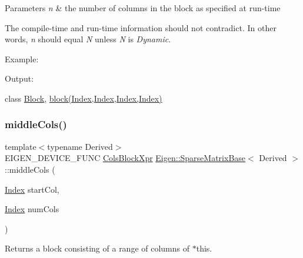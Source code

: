 \begin{DoxyParams}{Parameters}
{\em n} & the number of columns in the block as specified at run-\/time\\
\hline
\end{DoxyParams}
The compile-\/time and run-\/time information should not contradict. In other words, {\itshape n} should equal {\itshape N} unless {\itshape N} is {\itshape Dynamic}.

Example\+: 
\begin{DoxyCodeInclude}{0}
\end{DoxyCodeInclude}
 Output\+: 
\begin{DoxyVerbInclude}
\end{DoxyVerbInclude}
 class \mbox{\hyperlink{class_eigen_1_1_block}{Block}}, \mbox{\hyperlink{class_eigen_1_1_sparse_matrix_base_a7c28a2f511181c727396d5e813519d38}{block(\+Index,\+Index,\+Index,\+Index)}} \mbox{\label{class_eigen_1_1_sparse_matrix_base_a8a36ee6b1a072f07bfaaffd69cf31dbd}} 
\subsubsection{\texorpdfstring{middleCols()}{middleCols()}\hspace{0.1cm}{\footnotesize\ttfamily [1/2]}}
{\footnotesize\ttfamily template$<$typename Derived$>$ \\
E\+I\+G\+E\+N\+\_\+\+D\+E\+V\+I\+C\+E\+\_\+\+F\+U\+NC \mbox{\hyperlink{class_eigen_1_1_block}{Cols\+Block\+Xpr}} \mbox{\hyperlink{class_eigen_1_1_sparse_matrix_base}{Eigen\+::\+Sparse\+Matrix\+Base}}$<$ Derived $>$\+::middle\+Cols (\begin{DoxyParamCaption}\item[{\mbox{\hyperlink{struct_eigen_1_1_eigen_base_a554f30542cc2316add4b1ea0a492ff02}{Index}}}]{start\+Col,  }\item[{\mbox{\hyperlink{struct_eigen_1_1_eigen_base_a554f30542cc2316add4b1ea0a492ff02}{Index}}}]{num\+Cols }\end{DoxyParamCaption})\hspace{0.3cm}{\ttfamily [inline]}}

\begin{DoxyReturn}{Returns}
a block consisting of a range of columns of $\ast$this.
\end{DoxyReturn}

